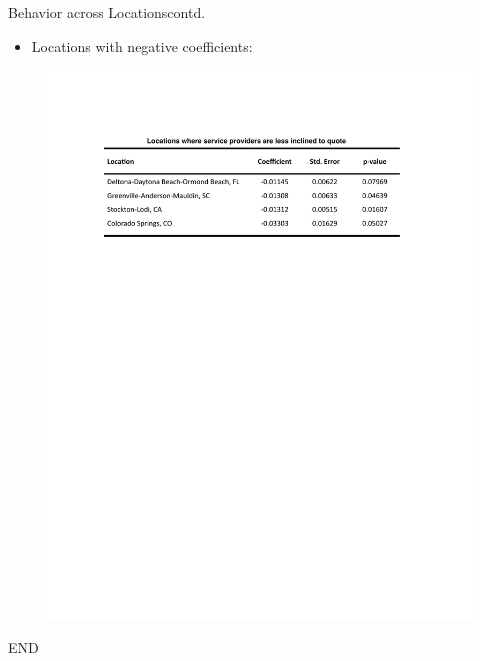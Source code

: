 \documentclass{beamer}
\begin{document}
\begin{frame}{Behavior across Locations}{contd.}
	\vspace{-0.5 in}
	\begin{itemize}
		 \item{Locations with negative coefficients:}\newline  
	\end{itemize}
		\vspace{-0.5 in}
	\begin{figure}{}
		\vspace*{-0 in}
		\scalebox{1}
		{\hspace*{-0 in}\includegraphics[scale=0.7]{coef_loc_less.pdf} }
	\end{figure}	
	\vspace*{-0 in}
\end{frame}

\begin{frame}{}{}
	\begin{center}
        		\Large{END}          
      \end{center}
\end{frame}
\end{document}
